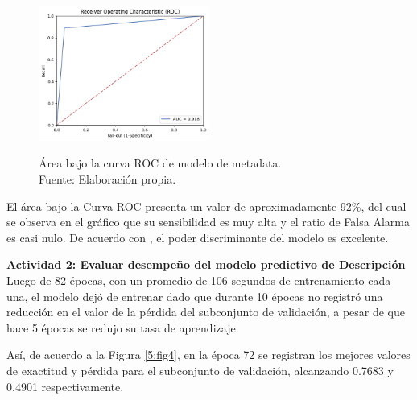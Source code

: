 \begin{figure}[!ht]
	\begin{center}
		\includegraphics[width=0.50\textwidth]{5/figures/metadata_auc.png}
		\caption[Área bajo la curva ROC de modelo de metadata]{Área bajo la curva ROC de modelo de metadata.\\
		Fuente: Elaboración propia.}
		\vspace{-0.5cm}
		\label{5:fig3}
	\end{center}
\end{figure}

El área bajo la Curva ROC presenta un valor de aproximadamente 92\%, del cual se observa en el gráfico que su sensibilidad es muy alta y el ratio de Falsa Alarma es casi nulo. De acuerdo con \cite{bk_britos2006datamining}, el poder discriminante del modelo es excelente.

\vspace{0.5cm}
\textbf{Actividad 2: Evaluar desempeño del modelo predictivo de Descripción}
\\
Luego de 82 épocas, con un promedio de 106 segundos de entrenamiento cada una, el modelo dejó de entrenar dado que durante 10 épocas no registró una reducción en el valor de la pérdida del subconjunto de validación, a pesar de que hace 5 épocas se redujo su tasa de aprendizaje.

Así, de acuerdo a la Figura \ref{5:fig4}, en la época 72 se registran los mejores valores de exactitud y pérdida para el subconjunto de validación, alcanzando 0.7683 y 0.4901 respectivamente.

